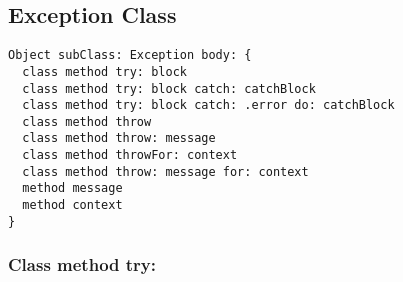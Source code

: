 \subsection {Exception Class}

\begin{lstlisting}
Object subClass: Exception body: {
  class method try: block
  class method try: block catch: catchBlock
  class method try: block catch: .error do: catchBlock
  class method throw
  class method throw: message
  class method throwFor: context
  class method throw: message for: context
  method message
  method context
}
\end{lstlisting}

\subsubsection{Class method try:}
